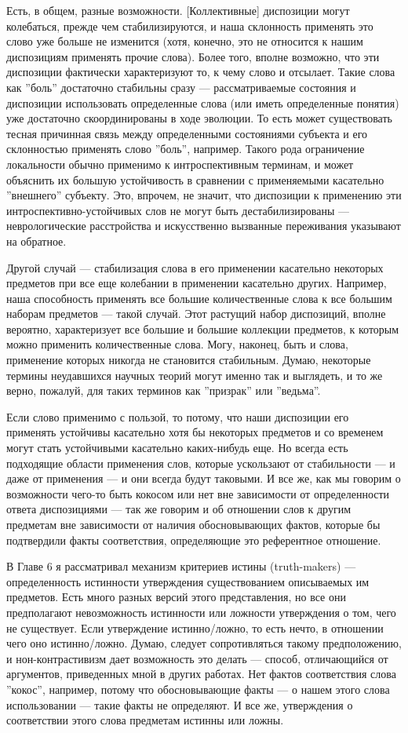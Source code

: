 \documentclass[11pt]{book}
\begin{document}
Есть, в общем, разные возможности. [Коллективные] диспозиции могут колебаться, прежде чем стабилизируются, и наша склонность применять это слово уже больше не изменится (хотя, конечно, это не относится к нашим диспозициям применять прочие слова). Более того, вполне возможно, что эти диспозиции фактически характеризуют то, к чему слово и отсылает. Такие слова как ''боль'' достаточно стабильны сразу --- рассматриваемые состояния и диспозиции использовать определенные слова (или иметь определенные понятия) уже достаточно скоординированы в ходе эволюции. То есть может существовать тесная причинная связь между определенными состояниями субъекта и его склонностью применять слово ''боль'', например. Такого рода ограничение локальности обычно применимо к интроспективным терминам, и может объяснить их большую устойчивость в сравнении с применяемыми касательно ''внешнего'' субъекту. Это, впрочем, не значит, что диспозиции к применению эти интроспективно-устойчивых слов не могут быть дестабилизированы --- неврологические расстройства и искусственно вызванные переживания указывают на обратное.

Другой случай --- стабилизация слова в его применении касательно некоторых предметов при все еще колебании в применении касательно других. Например, наша способность применять все большие количественные слова к все большим наборам предметов --- такой случай. Этот растущий набор диспозиций, вполне вероятно, характеризует все большие и большие коллекции предметов, к которым можно применить количественные слова. Могу, наконец, быть и слова, применение которых никогда не становится стабильным. Думаю, некоторые термины неудавшихся научных теорий могут именно так и выглядеть, и то же верно, пожалуй, для таких терминов как ''призрак'' или ''ведьма''.

Если слово применимо с пользой, то потому, что наши диспозиции его применять устойчивы касательно хотя бы некоторых предметов и со временем могут стать устойчивыми касательно каких-нибудь еще. Но всегда есть подходящие области применения слов, которые ускользают от стабильности --- и даже от применения --- и они всегда будут таковыми. И все же, как мы говорим о возможности чего-то быть кокосом или нет вне зависимости от определенности ответа диспозициями --- так же говорим и об отношении слов к другим предметам вне зависимости от наличия обосновывающих фактов, которые бы подтвердили факты соответствия, определяющие это референтное отношение.

В Главе 6 я рассматривал механизм критериев истины (truth-makers) --- определенность истинности утверждения существованием описываемых им предметов. Есть много разных версий этого представления, но все они предполагают невозможность истинности или ложности утверждения о том, чего не существует. Если утверждение истинно/ложно, то есть нечто, в отношении чего оно истинно/ложно. Думаю, следует сопротивляться такому предположению, и нон-контрастивизм дает возможность это делать --- способ, отличающийся от аргументов, приведенных мной в других работах. Нет фактов соответствия слова ''кокос'', например, потому что обосновывающие факты --- о нашем этого слова использовании --- такие факты не определяют. И все же, утверждения о соответствии этого слова предметам истинны или ложны.
\end{document}
